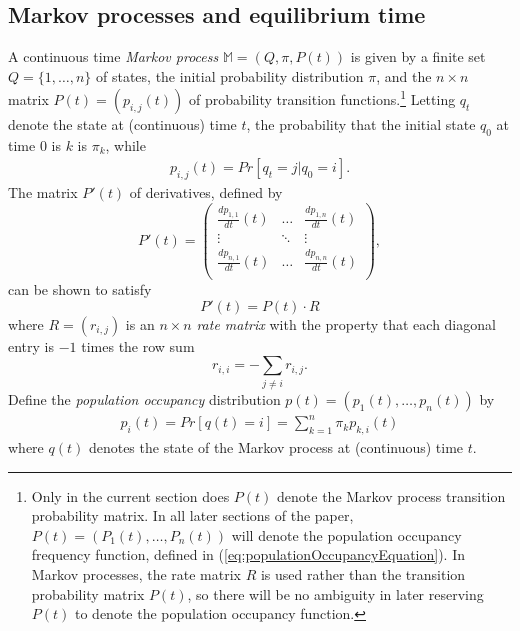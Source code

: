 \subsection{Markov processes and equilibrium time}



A continuous time {\em Markov process} $\mathbb{M}=(Q,\pi,P(t))$
is given by a finite set $Q= \{1,\ldots,n\}$ of states, the
initial probability distribution $\pi$,
and the $n\times n$ matrix $P(t)=(p_{i,j}(t))$ of
probability transition functions.\footnote{Only in the
current section does $P(t)$ denote the Markov process
transition probability matrix.  In all later sections of the paper,
$P(t) = (P_1(t),\ldots,P_n(t))$ will denote the population occupancy
frequency function, defined in (\ref{eq:populationOccupancyEquation}).
In Markov processes, the rate matrix $R$ is used rather than the transition
probability matrix $P(t)$, so there will be no ambiguity in later
reserving $P(t)$ to denote the population occupancy function.}
Letting $q_t$ denote the state at (continuous)
time $t$, the probability that the initial state $q_0$ at time $0$ is
$k$ is $\pi_k$, while
\begin{align}
\label{eq:MarkovProcess}
p_{i,j}(t) = Pr[q_{t} = j| q_0 = i] .
\end{align}
The matrix $P'(t)$ of derivatives, defined by
\begin{displaymath}
  P'(t) = \left(
\begin{array}{ccc}
\frac{d p_{1,1}}{d t}(t) & \ldots  & \frac{d p_{1,n}}{d t}(t)\\
\vdots & \ddots & \vdots\\
 \frac{d p_{n,1}}{d t}(t) & \ldots  & \frac{d p_{n,n}}{d t}(t)\\
\end{array}
\right),
\end{displaymath}
can be shown to satisfy
\begin{displaymath}
P'(t) = P(t) \cdot R
\end{displaymath}
where $R = (r_{i,j})$ is an $n \times n$ {\em rate matrix} with the
property that each diagonal entry is $-1$ times the row sum
\begin{displaymath}
r_{i,i} = - \sum_{j\ne i} r_{i,j}.
\end{displaymath}
Define the {\em population occupancy} distribution
$p(t) = (p_1(t),\ldots,p_n(t))$ by
\begin{align}
\label{eq:markovProcessPopulationFreq}
p_i(t) = Pr[q(t) = i] = \sum_{k=1}^n\pi_k p_{k,i}(t)
\end{align}
where $q(t)$ denotes the state of the Markov process
at (continuous) time $t$.

